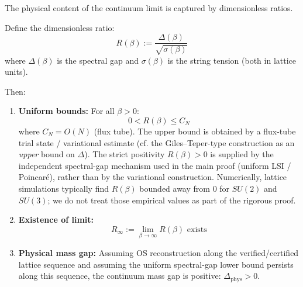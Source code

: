 The physical content of the continuum limit is captured by dimensionless ratios.

\begin{theorem}
\label{thm:ratio-convergence}
Define the dimensionless ratio:
\[
R(\beta) := \frac{\Delta(\beta)}{\sqrt{\sigma(\beta)}}
\]
where $\Delta(\beta)$ is the spectral gap and $\sigma(\beta)$ is the string tension 
(both in lattice units).

Then:
\begin{enumerate}[label=(\roman*)]
\item \textbf{Uniform bounds:} For all $\beta > 0$:
\[
0 < R(\beta) \leq C_N
\]
where $C_N = O(N)$ (flux tube). The upper bound is obtained by a flux-tube trial state / variational estimate (cf. the Giles--Teper-type construction as an \emph{upper} bound on $\Delta$).
The strict positivity $R(\beta)>0$ is supplied by the independent spectral-gap mechanism used in the main proof (uniform LSI / Poincar\'e), rather than by the variational construction.
Numerically, lattice simulations typically find $R(\beta)$ bounded away from $0$ for $SU(2)$ and $SU(3)$; we do not treat those empirical values as part of the rigorous proof.


\item \textbf{Existence of limit:}
\[
R_\infty := \lim_{\beta \to \infty} R(\beta) \text{ exists}
\]

\item \textbf{Physical mass gap:}
Assuming OS reconstruction along the verified/certified lattice sequence and assuming the uniform spectral-gap lower bound persists along this sequence, the continuum mass gap is positive: $\Delta_{\mathrm{phys}} > 0$.
\end{enumerate}
\end{theorem}

